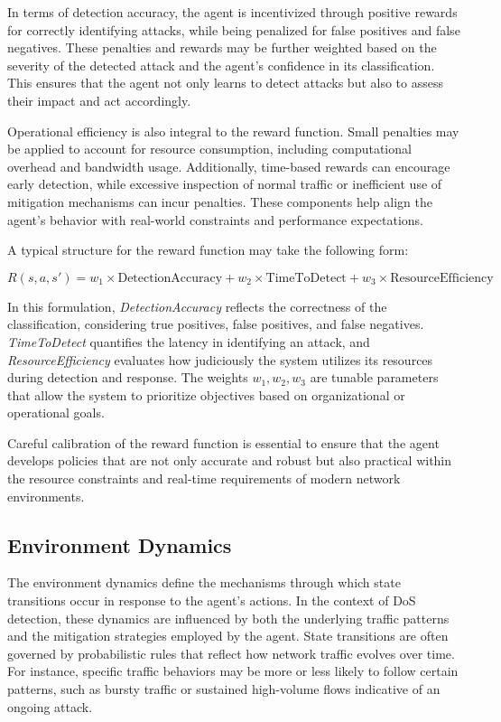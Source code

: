 \documentclass{report}
\begin{document}
In terms of detection accuracy, the agent is incentivized through positive rewards for correctly identifying attacks, while being penalized for false positives and false negatives. These penalties and rewards may be further weighted based on the severity of the detected attack and the agent’s confidence in its classification. This ensures that the agent not only learns to detect attacks but also to assess their impact and act accordingly.

Operational efficiency is also integral to the reward function. Small penalties may be applied to account for resource consumption, including computational overhead and bandwidth usage. Additionally, time-based rewards can encourage early detection, while excessive inspection of normal traffic or inefficient use of mitigation mechanisms can incur penalties. These components help align the agent’s behavior with real-world constraints and performance expectations.

A typical structure for the reward function may take the following form:

\begin{equation}
R(s, a, s') = w_{1} \times \text{DetectionAccuracy} + w_{2} \times \text{TimeToDetect} + w_{3} \times \text{ResourceEfficiency}
\end{equation}

In this formulation, \textit{DetectionAccuracy} reflects the correctness of the classification, considering true positives, false positives, and false negatives. \textit{TimeToDetect} quantifies the latency in identifying an attack, and \textit{ResourceEfficiency} evaluates how judiciously the system utilizes its resources during detection and response. The weights \(w_{1}, w_{2}, w_{3}\) are tunable parameters that allow the system to prioritize objectives based on organizational or operational goals.

Careful calibration of the reward function is essential to ensure that the agent develops policies that are not only accurate and robust but also practical within the resource constraints and real-time requirements of modern network environments.


\subsection{Environment Dynamics}

The environment dynamics define the mechanisms through which state transitions occur in response to the agent’s actions. In the context of DoS detection, these dynamics are influenced by both the underlying traffic patterns and the mitigation strategies employed by the agent. State transitions are often governed by probabilistic rules that reflect how network traffic evolves over time. For instance, specific traffic behaviors may be more or less likely to follow certain patterns, such as bursty traffic or sustained high-volume flows indicative of an ongoing attack.
\end{document}
